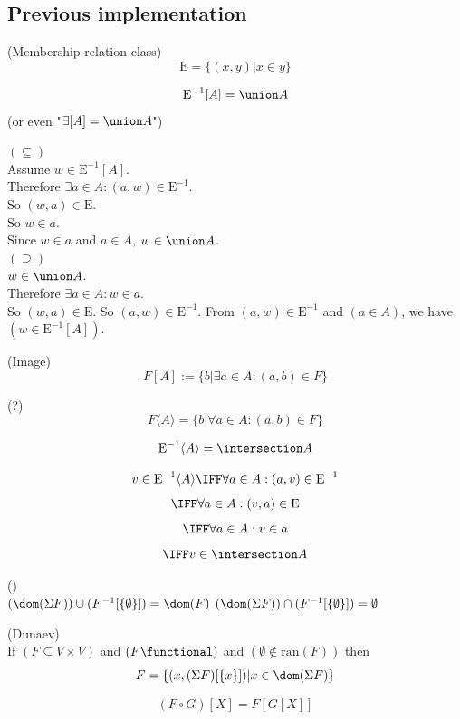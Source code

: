 \def\topic{}


\subsection{Previous implementation}

\begin{definition}(Membership relation class)
\[
\mbox{E} = \{(x,y)|x\in y\}
\]
\end{definition}



\begin{theorem}
\[
\mbox{E}^{-1}[A]=\union A
\]
(or even "$\exists [A]= \union A$")
\end{theorem}
\Proof
$(\subseteq)$\\
Assume $w\in \mbox{E}^{-1}[A]$.\\
Therefore $\exists a\in A: (a,w)\in \mbox{E}^{-1}$.\\
So $(w,a)\in \mbox{E}$.\\
So $w\in a$.\\
Since $w\in a$ and $a\in A$, $w\in \union A$.\\
$(\supseteq)$\\
$w\in \union A$.\\
Therefore $\exists a\in A: w\in a$.\\
So $(w,a)\in \mbox{E}$.
So $(a,w)\in \mbox{E}^{-1}$.
From $(a,w)\in \mbox{E}^{-1}$ and $(a\in A)$, we have $(w\in \mbox{E}^{-1}[A])$.\\
\Done

\begin{definition}(Image)
\[
F[A]:=\{b|\exists a\in A: (a,b)\in F\}
\]
\end{definition}
\begin{definition}(?)
\[
F\langle A \rangle=\{b|\forall a\in A: (a,b)\in F\}
\]
\end{definition}
\begin{theorem}
\[
\mbox{E}^{-1}\langle A\rangle =\intersection A
\]
\end{theorem}
\Proof
\[
v\in \mbox{E}^{-1}\langle A \rangle 
\IFF
\forall a\in A: (a,v)\in \mbox{E}^{-1}
\]
\[
\IFF
\forall a\in A: (v,a)\in \mbox{E}
\]
\[
\IFF
\forall a\in A: v \in a
\]
\[
\IFF
v \in \intersection A
\]

\Done
\begin{theorem}()\\
$(\dom(\Sigma F))\cup (F^{-1}[\{\emptyset\}]) = \dom(F)$
$\\
(\dom(\Sigma F))\cap (F^{-1}[\{\emptyset\}]) = \emptyset
$
\end{theorem}
\Proof
\Done

\begin{theorem}(Dunaev)\\
If $(F\subseteq V\times V)$ and $(F \functional)$ and $(\emptyset\notin\mbox{ran}(F))$ then
\[
F=\{(x,(\Sigma F)[\{x\}])|x\in \dom(\Sigma F)\}
\]
\end{theorem}
\Proof
\Done


\begin{theorem}
\[
(F \circ G)[X]=F[G[X]]
\]
\end{theorem}
\Proof
\Done

